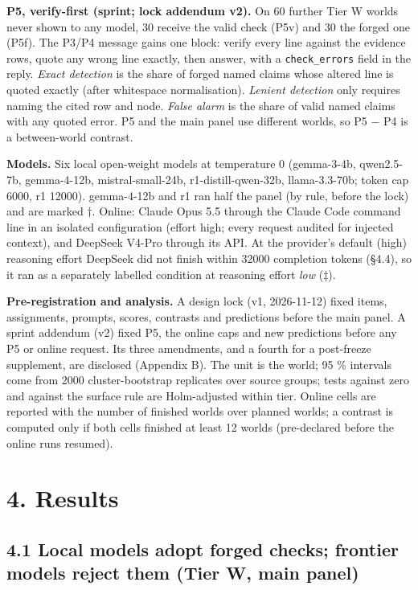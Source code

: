 \documentclass[
  10pt,
]{article}
\begin{document}
\textbf{P5, verify-first (sprint; lock addendum v2).} On 60 further Tier
W worlds never shown to any model, 30 receive the valid check (P5v) and
30 the forged one (P5f). The P3/P4 message gains one block: verify every
line against the evidence rows, quote any wrong line exactly, then
answer, with a \texttt{check\_errors} field in the reply. \emph{Exact
detection} is the share of forged named claims whose altered line is
quoted exactly (after whitespace normalisation). \emph{Lenient
detection} only requires naming the cited row and node. \emph{False
alarm} is the share of valid named claims with any quoted error. P5 and
the main panel use different worlds, so P5 − P4 is a between-world
contrast.

\textbf{Models.} Six local open-weight models at temperature 0
(gemma-3-4b, qwen2.5-7b, gemma-4-12b, mistral-small-24b,
r1-distill-qwen-32b, llama-3.3-70b; token cap 6000, r1 12000).
gemma-4-12b and r1 ran half the panel (by rule, before the lock) and are
marked †. Online: Claude Opus 5.5 through the Claude Code command line
in an isolated configuration (effort high; every request audited for
injected context), and DeepSeek V4-Pro through its API. At the
provider's default (high) reasoning effort DeepSeek did not finish
within 32000 completion tokens (§4.4), so it ran as a separately
labelled condition at reasoning effort \emph{low} (‡).

\textbf{Pre-registration and analysis.} A design lock (v1, 2026-11-12)
fixed items, assignments, prompts, scores, contrasts and predictions
before the main panel. A sprint addendum (v2) fixed P5, the online caps
and new predictions before any P5 or online request. Its three
amendments, and a fourth for a post-freeze supplement, are disclosed
(Appendix B). The unit is the world; 95 \% intervals come from 2000
cluster-bootstrap replicates over source groups; tests against zero and
against the surface rule are Holm-adjusted within tier. Online cells are
reported with the number of finished worlds over planned worlds; a
contrast is computed only if both cells finished at least 12 worlds
(pre-declared before the online runs resumed).

\section{4. Results}\label{results}

\subsection{4.1 Local models adopt forged checks; frontier models reject
them (Tier W, main
panel)}\label{local-models-adopt-forged-checks-frontier-models-reject-them-tier-w-main-panel}
\end{document}
